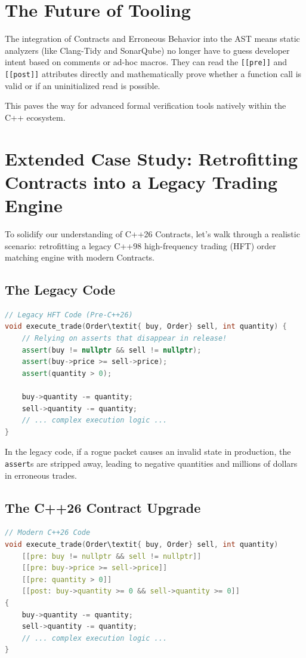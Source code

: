 {{{{{{{{\section{The Future of Tooling}

The integration of Contracts and Erroneous Behavior into the AST means static analyzers (like Clang-Tidy and SonarQube) no longer have to guess developer intent based on comments or ad-hoc macros. They can read the \texttt{[[pre]]} and \texttt{[[post]]} attributes directly and mathematically prove whether a function call is valid or if an uninitialized read is possible.

This paves the way for advanced formal verification tools natively within the C++ ecosystem.

\section{Extended Case Study: Retrofitting Contracts into a Legacy Trading Engine}

To solidify our understanding of C++26 Contracts, let's walk through a realistic scenario: retrofitting a legacy C++98 high-frequency trading (HFT) order matching engine with modern Contracts.

\subsection{The Legacy Code}

\begin{lstlisting}[language=C++]
// Legacy HFT Code (Pre-C++26)
void execute_trade(Order\textit{ buy, Order} sell, int quantity) {
    // Relying on asserts that disappear in release!
    assert(buy != nullptr && sell != nullptr);
    assert(buy->price >= sell->price);
    assert(quantity > 0);
    
    buy->quantity -= quantity;
    sell->quantity -= quantity;
    // ... complex execution logic ...
}
\end{lstlisting}

In the legacy code, if a rogue packet causes an invalid state in production, the \texttt{assert}s are stripped away, leading to negative quantities and millions of dollars in erroneous trades.

\subsection{The C++26 Contract Upgrade}

\begin{lstlisting}[language=C++]
// Modern C++26 Code
void execute_trade(Order\textit{ buy, Order} sell, int quantity)
    [[pre: buy != nullptr && sell != nullptr]]
    [[pre: buy->price >= sell->price]]
    [[pre: quantity > 0]]
    [[post: buy->quantity >= 0 && sell->quantity >= 0]]
{
    buy->quantity -= quantity;
    sell->quantity -= quantity;
    // ... complex execution logic ...
}
\end{lstlisting}

}}}}}}}}
